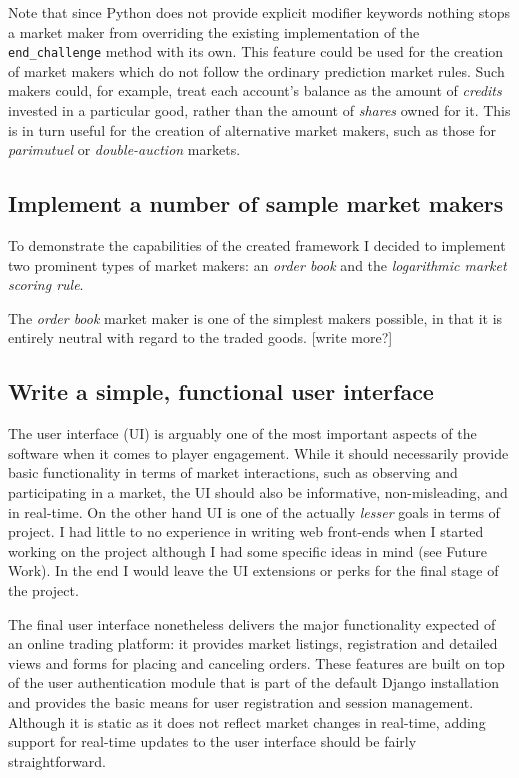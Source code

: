 \documentclass[bsc,frontabs,twoside,singlespacing,parskip,deptreport]{infthesis}     %
\begin{document}
Note that since Python does not provide explicit modifier keywords nothing stops a market maker from overriding the existing implementation of the {\tt end\_challenge} method with its own. This feature could be used for the creation of market makers which do not follow the ordinary prediction market rules. Such makers could, for example, treat each account's balance as the amount of {\it credits} invested in a particular good, rather than the amount of {\it shares} owned for it. This is in turn useful for the creation of alternative market makers, such as those for {\em parimutuel} or {\em double-auction} markets. 

    
\subsection{Implement a number of sample market makers}

	To demonstrate the capabilities of the created framework I decided to implement two prominent types of market makers: an {\em order book} and the {\em logarithmic market scoring rule}. 

	The {\em order book} market maker is one of the simplest makers possible, in that it is entirely neutral with regard to the traded goods. [write more?]


\subsection{Write a simple, functional user interface}
    The user interface (UI) is arguably one of the most important aspects of the software when it comes to player engagement. While it should necessarily provide basic functionality in terms of market interactions, such as observing and participating in a market, the UI should also be informative, non-misleading, and in real-time. 
On the other hand UI is one of the actually {\em lesser} goals in terms of project. I had little to no experience in writing web front-ends when I started working on the project although I had some specific ideas in mind (see Future Work). In the end I would leave the UI extensions or perks for the final stage of the project. 
    
    The final user interface nonetheless delivers the major functionality expected of an online trading platform: it provides market listings, registration and detailed views and forms for placing and canceling orders. These features are built on top of the user authentication module that is part of the default Django installation and provides the basic means for user registration and session management. Although it is static as it does not reflect market changes in real-time, adding support for real-time updates to the user interface should be fairly straightforward.
    
\end{document}
